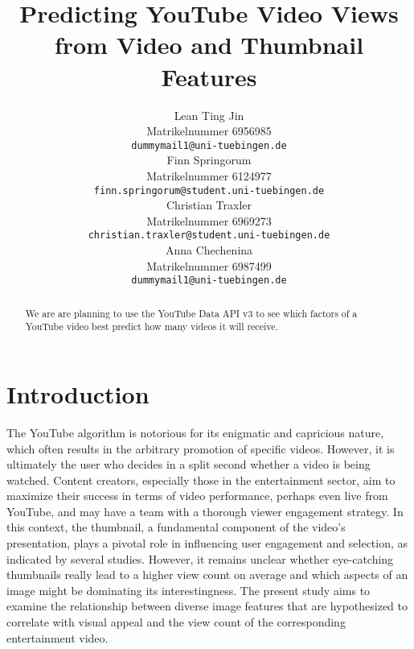 \documentclass{article}
\title{Predicting YouTube Video Views \\from Video and Thumbnail Features}
\author{%
  Lean Ting Jin\\
  Matrikelnummer 6956985\\
  \texttt{dummymail1@uni-tuebingen.de} \\
  \And
  Finn Springorum\\
  Matrikelnummer 6124977\\
  \texttt{finn.springorum@student.uni-tuebingen.de} \\
  \And
  Christian Traxler\\
  Matrikelnummer 6969273\\
  \texttt{christian.traxler@student.uni-tuebingen.de} \\
  \And
  Anna Chechenina\\
  Matrikelnummer 6987499\\
  \texttt{dummymail1@uni-tuebingen.de} \\
}
\begin{document}
\maketitle

\begin{abstract}
  We are are planning to use the YouTube Data API v3 \cite{youtubeapi} to see which factors of a YouTube video best predict how many videos it will receive. 

\end{abstract}

\section{Introduction}
The YouTube algorithm is notorious for its enigmatic and capricious nature, which often results in the arbitrary promotion of specific videos. However, it is ultimately the user who decides in a split second whether a video is being watched. Content creators, especially those in the entertainment sector, aim to maximize their success in terms of video performance, perhaps even live from YouTube, and may have a team with a thorough viewer engagement strategy. In this context, the thumbnail, a fundamental component of the video's presentation, plays a pivotal role in influencing user engagement and selection, as indicated by several studies. However, it remains unclear whether eye-catching thumbnails really lead to a higher view count on average and which aspects of an image might be dominating its interestingness. The present study aims to examine the relationship between diverse image features that are hypothesized to correlate with visual appeal and the view count of the corresponding entertainment video.
\end{document}

